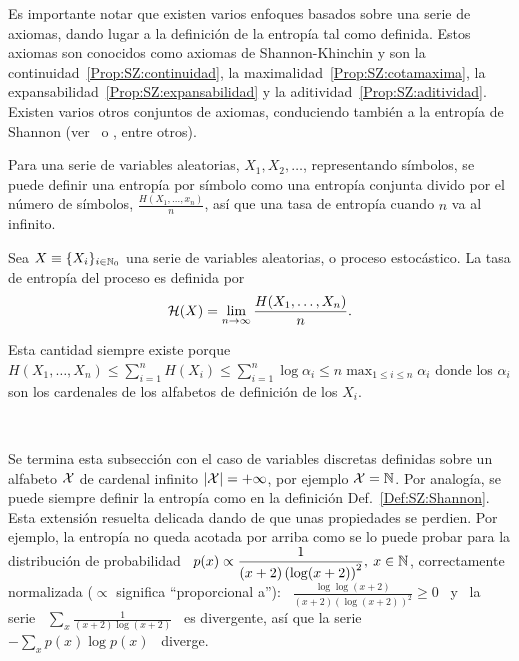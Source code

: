 Es  importante notar  que existen  varios enfoques  basados sobre  una  serie de
axiomas, dando lugar a la definici\'on de la entrop\'ia tal como definida. Estos
axiomas   son   conocidos   como   axiomas   de  Shannon-Khinchin   y   son   la
continuidad~\ref{Prop:SZ:continuidad},  la maximalidad~\ref{Prop:SZ:cotamaxima},
la           expansabilidad~\ref{Prop:SZ:expansabilidad}           y          la
aditividad~\ref{Prop:SZ:aditividad}.  Existen varios otros conjuntos de axiomas,
conduciendo  tambi\'en a  la entrop\'ia  de Shannon  (ver~\cite[Sec.~6]{Sha48} o
\cite{ShaWea64, Fad56, Fad58, Khi57, Ren61}, entre otros).

Para  una  serie de  variables  aleatorias,  $X_1,  X_2, \ldots$,  representando
s\'imbolos, se  puede definir una  entrop\'ia por s\'imbolo como  una entrop\'ia
conjunta  divido por el  n\'umero de  s\'imbolos, $\frac{H(X_1,\ldots,x_n)}{n}$,
as\'i que una tasa de entrop\'ia cuando $n$ va al infinito.
%
\begin{definicion}
\label{Def:SZ:TasaDeEntropia}
%
  Sea $X \equiv \{ X_i \}_{i  \in \mathbb{N}_0}$ una serie de variables aleatorias, o
  proceso estoc\'astico.  La tasa de entrop\'ia del proceso es definida por
  \[
  \mathcal{H}(X) = \lim_{n \to \infty} \frac{H(X_1,\ldots,X_n)}{n}.
  \]
\end{definicion}
%
\noindent Esta  cantidad siempre existe  porque $\displaystyle H(X_1 ,  \ldots ,
X_n) \le \sum_{i=1}^n H(X_i) \le \sum_{i=1}^n  \log \alpha_i \le n \max_{1 \le i
  \le n} \alpha_i$  donde los $\alpha_i$ son los cardenales  de los alfabetos de
definici\'on de los $X_i$.

\

Se termina esta subsecci\'on con el caso de variables discretas definidas sobre
un  alfabeto $\mathcal{X}$ de  cardenal infinito  $|\mathcal{X}| =  + \infty$,  por ejemplo  $\mathcal{X} =
\mathbb{N}$.   Por analog\'ia,  se puede  siempre definir  la entrop\'ia  como  en la
definici\'on Def.~\ref{Def:SZ:Shannon}. Esta extensi\'on resuelta delicada dando
de que unas propiedades se perdien.  Por ejemplo, la entrop\'ia no queda acotada
por arriba  como se  lo puede  probar para la  distribuci\'on de  probabilidad \
$\displaystyle p(x)  \propto \frac{1}{(x+2) \left(  \log (x+2) \right)^2},  \: x
\in \mathbb{N}$, correctamente  normalizada ($\propto$ significa ``proporcional a''):
\ $\displaystyle \frac{\log \log(x+2)}{(x+2) \left( \log (x+2) \right)^2} \ge 0$
\  y  \ la  serie  \  $\displaystyle \sum_x  \frac{1}{(x+2)  \log  (x+2)}$ \  es
divergente,  as\'i que  la serie  \ $\displaystyle  - \sum_x  p(x) \log  p(x)$ \
diverge.

